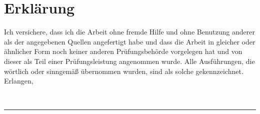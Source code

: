 
\chapter*{Erklärung}
\thispagestyle{empty}
Ich versichere, dass ich die Arbeit ohne fremde Hilfe und ohne Benutzung
anderer als der angegebenen Quellen angefertigt habe und dass die
Arbeit in gleicher oder \"ahnlicher Form noch keiner anderen
Pr\"ufungsbeh\"orde vorgelegen hat und von dieser als Teil einer
Pr\"ufungsleistung angenommen wurde.
Alle Ausf\"uhrungen, die w\"ortlich oder sinngem\"a\ss{}
\"ubernommen wurden, sind als solche gekennzeichnet.
\\[2cm]
Erlangen, 
	{\date{\dateenglish{\today}}}
    	{\date{\dategerman{\today}}}
\\[3cm]
\rule{6cm}{0.5pt}\\
\parbox[l][1cm][c]{6cm}{\hfill \studname \hfill\vbox{}}


